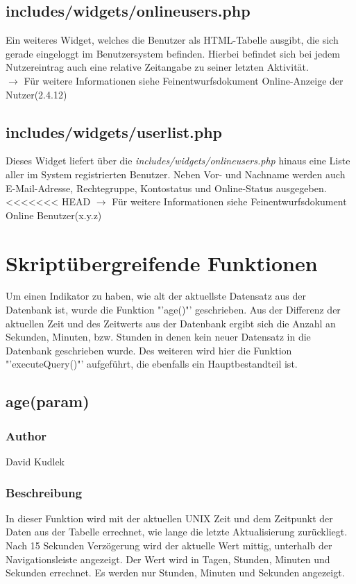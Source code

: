 \documentclass[fontsize = 12pt, paper = a4]{scrreprt}
\begin{document}
\subsection{includes/widgets/onlineusers.php}
Ein weiteres Widget, welches die Benutzer als HTML-Tabelle ausgibt, die sich gerade eingeloggt im Benutzersystem befinden. Hierbei befindet sich bei jedem Nutzereintrag auch eine relative Zeitangabe zu seiner letzten Aktivität.\\
$\rightarrow$ Für weitere Informationen siehe Feinentwurfsdokument \glqq Online-Anzeige der Nutzer\grqq (2.4.12)

\subsection{includes/widgets/userlist.php}
Dieses Widget liefert über die \textit{includes/widgets/onlineusers.php} hinaus eine Liste aller im System registrierten Benutzer. Neben Vor- und Nachname werden auch E-Mail-Adresse, Rechtegruppe, Kontostatus und Online-Status ausgegeben.
<<<<<<< HEAD
$\rightarrow$ Für weitere Informationen siehe Feinentwurfsdokument \glqq Online Benutzer\grqq (x.y.z)



\section{Skriptübergreifende Funktionen}
Um einen Indikator zu haben, wie alt der aktuellste Datensatz aus der Datenbank ist, wurde die Funktion "'age()"' geschrieben. Aus der Differenz der aktuellen Zeit und des Zeitwerts aus der Datenbank ergibt sich die Anzahl an Sekunden, Minuten, bzw. Stunden in denen kein neuer Datensatz in die Datenbank geschrieben wurde. Des weiteren wird hier die Funktion "'executeQuery()"' aufgeführt, die ebenfalls ein Hauptbestandteil ist.

\subsection*{age(param)}

\subsubsection*{Author}
David Kudlek
\subsubsection*{Beschreibung}
In dieser Funktion wird mit der aktuellen UNIX Zeit und dem Zeitpunkt der Daten aus der Tabelle errechnet, wie lange die letzte Aktualisierung zurückliegt. Nach 15 Sekunden Verzögerung wird der aktuelle Wert mittig, unterhalb der Navigationsleiste angezeigt. Der Wert wird in Tagen, Stunden, Minuten und Sekunden errechnet. Es werden nur Stunden, Minuten und Sekunden angezeigt. 	
\end{document}

